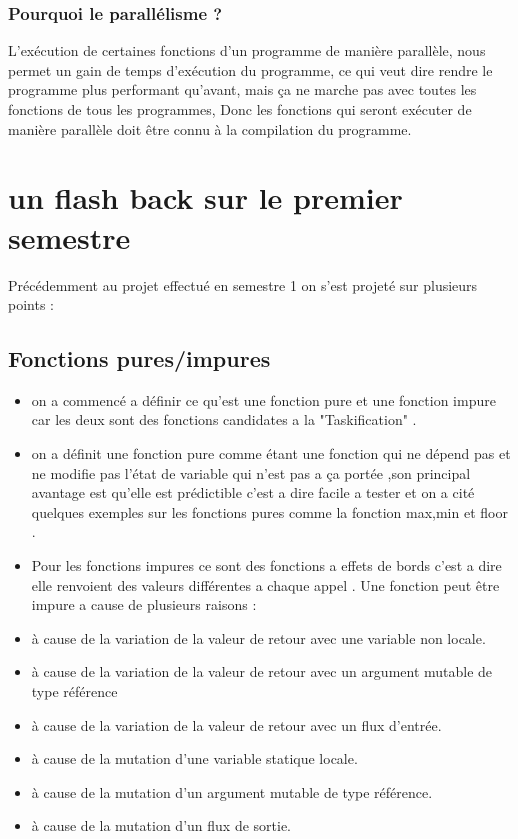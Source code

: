\documentclass[12pt,titlepage]{article}
\begin{document}
\subsubsection{Pourquoi le parallélisme ?}

 L’exécution de  certaines fonctions d'un programme de manière parallèle, nous permet un gain de temps d'exécution du programme, ce qui veut dire rendre le programme plus performant qu'avant, mais ça ne marche pas avec toutes  les fonctions de tous les programmes, Donc  les fonctions qui seront exécuter de manière parallèle doit être connu à la compilation du programme.
\section{un flash back sur le premier semestre  }
Précédemment au projet effectué en semestre 1 on s'est projeté sur plusieurs points : 
\subsection{Fonctions pures/impures}
\begin{itemize}
    \item on a commencé a définir ce qu'est une fonction pure et une fonction impure car les deux sont des fonctions candidates a la "Taskification" .
    \item on a définit une fonction pure comme étant une fonction qui ne dépend pas et ne modifie pas l'état de variable qui n'est pas a ça portée ,son principal avantage est qu'elle est prédictible c'est a dire facile a tester  et on a cité quelques exemples sur les fonctions pures comme la fonction max,min et floor .
    \item Pour les fonctions impures ce sont des fonctions a effets de bords c'est a dire elle renvoient des valeurs différentes a chaque appel . Une fonction peut être impure a cause de plusieurs raisons :
    \item à cause de la variation de la valeur de retour avec une variable non locale.
    \item à cause de la variation de la valeur de retour avec un argument mutable de type référence
    \item à cause de la variation de la valeur de retour avec un flux d’entrée.
    \item à cause de la mutation d’une variable statique locale.
    \item à cause de la mutation d’un argument mutable de type référence.
    \item à cause de la mutation d’un flux de sortie.
\end{itemize}
\end{document}
